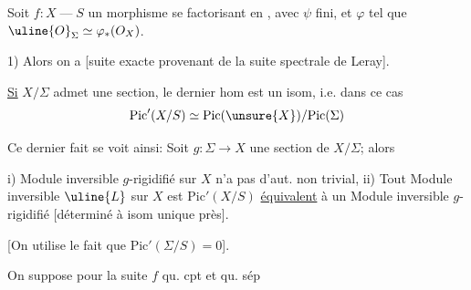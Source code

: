Soit $f:X\mathbin{\text{---}}S$ un morphisme se factorisant en
, avec $\psi$ fini, et $\varphi$ tel que $\uline{O}_{\Sigma}\simeq\varphi_*(O_X)$.

1) Alors on a
[suite exacte provenant de la suite spectrale de Leray].

 \uline{Si} $X/\Sigma$ admet une section, le dernier hom est un isom, i.e. dans ce cas
\[
\mathrm{Pic}'(X/S)\simeq\mathrm{Pic}(\unsure{X})/\mathrm{Pic}(\Sigma)
\]

Ce dernier fait se voit ainsi:  Soit $g:\Sigma\longrightarrow X$ une section de $X/\Sigma$; alors

i)  Module inversible $g$-rigidifié sur $X$ n'a pas d'aut. non trivial, ii) Tout Module inversible $\uline{L}$ sur $X$ est  $\mathrm{Pic}'(X/S)$ \uline{équivalent} à  un Module inversible $g$-rigidifié  [déterminé à isom unique près].

[On utilise le fait que $\mathrm{Pic}'(\Sigma/S)=0$].

On suppose pour la suite $f$ qu. cpt et qu. sép

